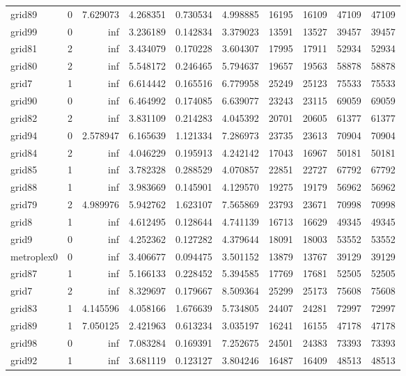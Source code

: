 \begin{longtable}{|l|r|r|r|r|r|r|r|r|r|}
grid89 & 0 & 7.629073 & 4.268351 & 0.730534 & 4.998885 & 16195 & 16109 & 47109 & 47109 \\
grid99 & 0 & inf & 3.236189 & 0.142834 & 3.379023 & 13591 & 13527 & 39457 & 39457 \\
grid81 & 2 & inf & 3.434079 & 0.170228 & 3.604307 & 17995 & 17911 & 52934 & 52934 \\
grid80 & 2 & inf & 5.548172 & 0.246465 & 5.794637 & 19657 & 19563 & 58878 & 58878 \\
grid7 & 1 & inf & 6.614442 & 0.165516 & 6.779958 & 25249 & 25123 & 75533 & 75533 \\
grid90 & 0 & inf & 6.464992 & 0.174085 & 6.639077 & 23243 & 23115 & 69059 & 69059 \\
grid82 & 2 & inf & 3.831109 & 0.214283 & 4.045392 & 20701 & 20605 & 61377 & 61377 \\
grid94 & 0 & 2.578947 & 6.165639 & 1.121334 & 7.286973 & 23735 & 23613 & 70904 & 70904 \\
grid84 & 2 & inf & 4.046229 & 0.195913 & 4.242142 & 17043 & 16967 & 50181 & 50181 \\
grid85 & 1 & inf & 3.782328 & 0.288529 & 4.070857 & 22851 & 22727 & 67792 & 67792 \\
grid88 & 1 & inf & 3.983669 & 0.145901 & 4.129570 & 19275 & 19179 & 56962 & 56962 \\
grid79 & 2 & 4.989976 & 5.942762 & 1.623107 & 7.565869 & 23793 & 23671 & 70998 & 70998 \\
grid8 & 1 & inf & 4.612495 & 0.128644 & 4.741139 & 16713 & 16629 & 49345 & 49345 \\
grid9 & 0 & inf & 4.252362 & 0.127282 & 4.379644 & 18091 & 18003 & 53552 & 53552 \\
metroplex0 & 0 & inf & 3.406677 & 0.094475 & 3.501152 & 13879 & 13767 & 39129 & 39129 \\
grid87 & 1 & inf & 5.166133 & 0.228452 & 5.394585 & 17769 & 17681 & 52505 & 52505 \\
grid7 & 2 & inf & 8.329697 & 0.179667 & 8.509364 & 25299 & 25173 & 75608 & 75608 \\
grid83 & 1 & 4.145596 & 4.058166 & 1.676639 & 5.734805 & 24407 & 24281 & 72997 & 72997 \\
grid89 & 1 & 7.050125 & 2.421963 & 0.613234 & 3.035197 & 16241 & 16155 & 47178 & 47178 \\
grid98 & 0 & inf & 7.083284 & 0.169391 & 7.252675 & 24501 & 24383 & 73393 & 73393 \\
grid92 & 1 & inf & 3.681119 & 0.123127 & 3.804246 & 16487 & 16409 & 48513 & 48513 \\

\end{longtable}
